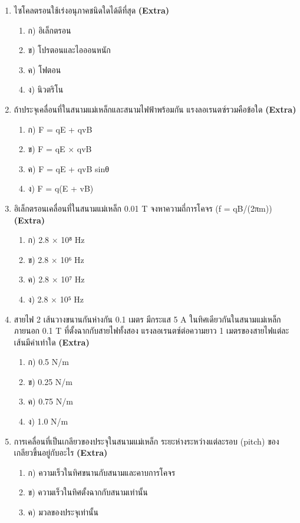 \documentclass[12pt]{article}
\begin{document}
\begin{enumerate}[label=\arabic*.]
\item ไซโคลตรอนใช้เร่งอนุภาคชนิดใดได้ดีที่สุด \hfill \textbf{\small (Extra)}
\begin{enumerate}[label=)]
\item ก) อิเล็กตรอน
\item ข) โปรตอนและไอออนหนัก
\item ค) โฟตอน
\item ง) นิวตริโน
\end{enumerate}
\item ถ้าประจุเคลื่อนที่ในสนามแม่เหล็กและสนามไฟฟ้าพร้อมกัน แรงลอเรนตซ์รวมคือข้อใด \hfill \textbf{\small (Extra)}
\begin{enumerate}[label=)]
\item ก) F = qE + qvB
\item ข) F = qE × qvB
\item ค) F = qE + qvB sinθ
\item ง) F = q(E + vB)
\end{enumerate}
\item อิเล็กตรอนเคลื่อนที่ในสนามแม่เหล็ก 0.01 T จงหาความถี่การโคจร (f = qB/(2πm)) \hfill \textbf{\small (Extra)}
\begin{enumerate}[label=)]
\item ก) 2.8 × 10⁸ Hz
\item ข) 2.8 × 10⁶ Hz
\item ค) 2.8 × 10⁷ Hz
\item ง) 2.8 × 10⁵ Hz
\end{enumerate}
\item สายไฟ 2 เส้นวางขนานกันห่างกัน 0.1 เมตร มีกระแส 5 A ในทิศเดียวกันในสนามแม่เหล็กภายนอก 0.1 T ที่ตั้งฉากกับสายไฟทั้งสอง แรงลอเรนตซ์ต่อความยาว 1 เมตรของสายไฟแต่ละเส้นมีค่าเท่าใด \hfill \textbf{\small (Extra)}
\begin{enumerate}[label=)]
\item ก) 0.5 N/m
\item ข) 0.25 N/m
\item ค) 0.75 N/m
\item ง) 1.0 N/m
\end{enumerate}
\item การเคลื่อนที่เป็นเกลียวของประจุในสนามแม่เหล็ก ระยะห่างระหว่างแต่ละรอบ (pitch) ของเกลียวขึ้นอยู่กับอะไร \hfill \textbf{\small (Extra)}
\begin{enumerate}[label=)]
\item ก) ความเร็วในทิศขนานกับสนามและคาบการโคจร
\item ข) ความเร็วในทิศตั้งฉากกับสนามเท่านั้น
\item ค) มวลของประจุเท่านั้น

\end{enumerate}
\end{enumerate}
\end{document}
